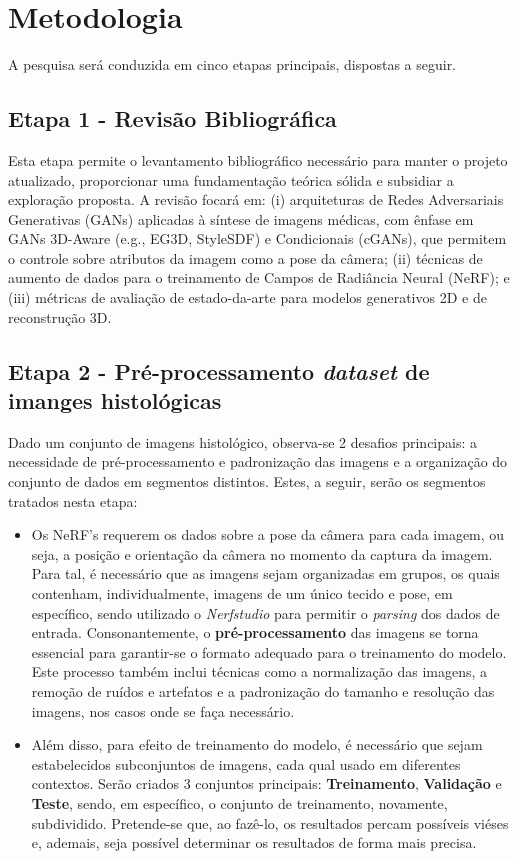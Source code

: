 \section{Metodologia}

A pesquisa será conduzida em cinco etapas principais, dispostas a seguir.


\subsection{Etapa 1 - Revisão Bibliográfica}

Esta etapa permite o levantamento bibliográfico necessário para manter o projeto atualizado, proporcionar uma fundamentação teórica sólida e subsidiar a exploração proposta. A revisão focará em: (i) arquiteturas de Redes Adversariais Generativas (GANs) aplicadas à síntese de imagens médicas, com ênfase em GANs 3D-Aware (e.g., EG3D, StyleSDF) e Condicionais (cGANs), que permitem o controle sobre atributos da imagem como a pose da câmera; (ii) técnicas de aumento de dados para o treinamento de Campos de Radiância Neural (NeRF); e (iii) métricas de avaliação de estado-da-arte para modelos generativos 2D e de reconstrução 3D.


\subsection{Etapa 2 - Pré-processamento \textit{dataset} de imanges histológicas}

  Dado um conjunto de imagens histológico, observa-se 2 desafios principais: a necessidade de pré-processamento e padronização das imagens e a organização do conjunto de dados em segmentos distintos. Estes, a seguir, serão os segmentos tratados nesta etapa:

\begin{itemize}
  \item Os NeRF's requerem os dados sobre a pose da câmera para cada imagem, ou seja, a posição e orientação da câmera no momento da captura da imagem. Para tal, é necessário que as imagens sejam organizadas em grupos, os quais contenham, individualmente, imagens de um único tecido e pose, em específico, sendo utilizado o \textit{Nerfstudio} para permitir o \textit{parsing} dos dados de entrada. Consonantemente, o \textbf{pré-processamento} das imagens se torna essencial para garantir-se o formato adequado para o treinamento do modelo. Este processo também inclui técnicas como a normalização das imagens, a remoção de ruídos e artefatos e a padronização do tamanho e resolução das imagens, nos casos onde se faça necessário.

    \item  Além disso, para efeito de treinamento do modelo, é necessário que sejam estabelecidos subconjuntos de imagens, cada qual usado em diferentes contextos. Serão criados 3 conjuntos principais: \textbf{Treinamento}, \textbf{Validação} e  \textbf{Teste}, sendo, em específico, o conjunto de treinamento, novamente, subdividido. Pretende-se que, ao fazê-lo, os resultados percam possíveis viéses e, ademais, seja possível determinar os resultados de forma mais precisa.
  \end{itemize}

